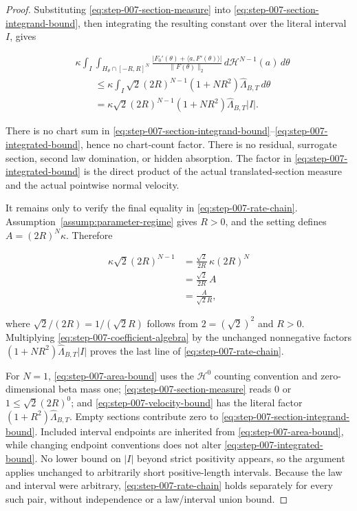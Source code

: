 \begin{proof}
Substituting \eqref{eq:step-007-section-measure} into
\eqref{eq:step-007-section-integrand-bound}, then integrating the resulting
constant over the literal interval \(I\), gives

\begin{equation}
\begin{aligned}
&\kappa\int_I\int_{H_\theta\cap[-R,R]^N}
\frac{\lvert F_0'(\theta)+\langle a,F'(\theta)\rangle\rvert}
{\lVert F(\theta)\rVert_2}
\,d\mathcal H^{N-1}(a)\,d\theta\\
&\qquad\leq
\kappa\int_I
\sqrt2(2R)^{N-1}(1+NR^2)\widehat\Lambda_{B,T}
\,d\theta\\
&\qquad=
\kappa\sqrt2(2R)^{N-1}(1+NR^2)
\widehat\Lambda_{B,T}\lvert I\rvert.
\end{aligned}
\label{eq:step-007-integrated-bound}
\end{equation}

There is no chart sum in
\eqref{eq:step-007-section-integrand-bound}--\eqref{eq:step-007-integrated-bound},
hence no chart-count factor. There is no residual, surrogate section,
second law domination, or hidden absorption. The factor in
\eqref{eq:step-007-integrated-bound} is the direct product of the actual
translated-section measure and the actual pointwise normal velocity.

It remains only to verify the final equality in
\eqref{eq:step-007-rate-chain}. Assumption~\ref{assump:parameter-regime} gives
\(R>0\), and the setting defines \(A=(2R)^N\kappa\). Therefore

\begin{equation}
\begin{aligned}
\kappa\sqrt2(2R)^{N-1}
&=\frac{\sqrt2}{2R}\,\kappa(2R)^N\\
&=\frac{\sqrt2}{2R}\,A\\
&=\frac{A}{\sqrt2R},
\end{aligned}
\label{eq:step-007-coefficient-algebra}
\end{equation}

where \(\sqrt2/(2R)=1/(\sqrt2R)\) follows from \(2=(\sqrt2)^2\) and \(R>0\). Multiplying
\eqref{eq:step-007-coefficient-algebra} by the unchanged
nonnegative factors
\((1+NR^2)\widehat\Lambda_{B,T}\lvert I\rvert\) proves the last line of
\eqref{eq:step-007-rate-chain}.

For \(N=1\), \eqref{eq:step-007-area-bound} uses the \(\mathcal H^0\)
counting convention and zero-dimensional beta mass one;
\eqref{eq:step-007-section-measure} reads \(0\) or
\(1\leq\sqrt2(2R)^0\); and \eqref{eq:step-007-velocity-bound} has the literal factor
\((1+R^2)\widehat\Lambda_{B,T}\). Empty sections contribute zero to
\eqref{eq:step-007-section-integrand-bound}. Included interval endpoints are
inherited from \eqref{eq:step-007-area-bound}, while changing endpoint
conventions does not alter \eqref{eq:step-007-integrated-bound}. No lower bound on
\(\lvert I\rvert\) beyond strict positivity appears, so the argument applies unchanged to arbitrarily short
positive-length intervals. Because the law and interval were arbitrary,
\eqref{eq:step-007-rate-chain} holds separately for every such
pair, without independence or a law/interval union bound. 
\end{proof}

